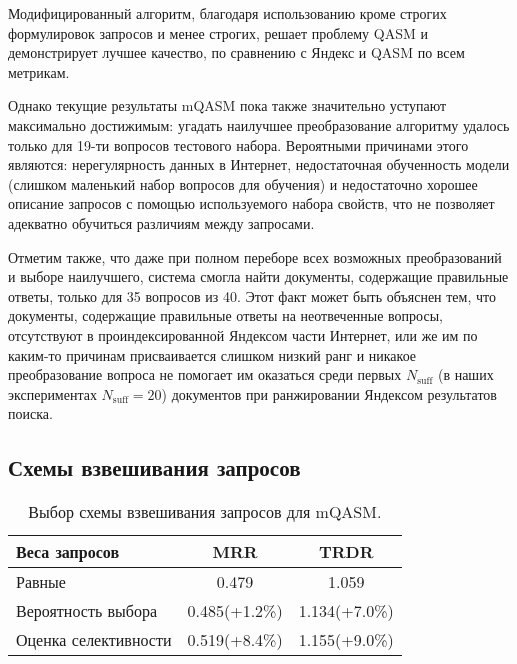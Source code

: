\documentclass{article}
\begin{document}
Модифицированный алгоритм, благодаря использованию
кроме строгих формулировок запросов и менее строгих,
решает проблему QASM и демонстрирует лучшее
качество, по сравнению с Яндекс и QASM по всем метрикам.

Однако текущие результаты mQASM пока также значительно уступают максимально
достижимым: угадать наилучшее преобразование алгоритму удалось только для
19-ти вопросов тестового набора. Вероятными причинами этого являются:
нерегулярность данных в Интернет, недостаточная обученность модели (слишком
маленький набор вопросов для обучения) и недостаточно хорошее %
описание запросов с помощью используемого набора свойств, что не позволяет
адекватно обучиться различиям между запросами.

Отметим также, что даже при полном переборе всех возможных преобразований и
выборе наилучшего, система смогла найти документы, содержащие правильные
ответы, только для 35 вопросов из 40. Этот факт может быть объяснен тем, что
документы, содержащие правильные ответы на неотвеченные вопросы, отсутствуют
в проиндексированной Яндексом части Интернет, или же им по каким-то причинам
присваивается слишком низкий ранг и никакое преобразование вопроса не
помогает им оказаться среди первых
$N_{\text{suff}}$ (в наших экспериментах $N_{\text{suff}}=20$)
документов при ранжировании Яндексом результатов поиска.


\subsection{Схемы взвешивания запросов}

\begin{table*}[tb]
\begin{center}
\begin{tabular}{|l|c|c|}
\hline
Веса запросов & MRR & TRDR \\
\hline
\hline
Равные & 0.479 & 1.059 \\
Вероятность выбора & 0.485(+1.2\%) & 1.134(+7.0\%) \\
Оценка селективности & 0.519(+8.4\%) & 1.155(+9.0\%) \\
\hline
\end{tabular}
\caption{Выбор схемы взвешивания запросов для mQASM.}
\label{table:weighting}
\end{center}
\end{table*}
\end{document}
